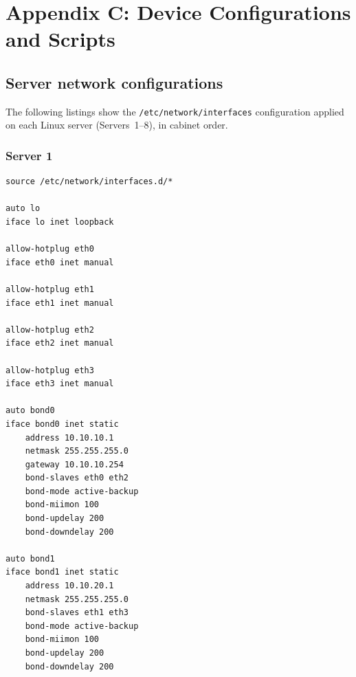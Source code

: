 \chapter{Appendix C: Device Configurations and Scripts}
\label{app:configs}

\section{Server network configurations}

The following listings show the \texttt{/etc/network/interfaces} configuration applied on each Linux server (Servers~1--8), in cabinet order.

\subsection{Server 1}
\begin{lstlisting}[caption={Server 1: network interfaces (Cabinet A).},basicstyle=\ttfamily\footnotesize,breaklines=true]
source /etc/network/interfaces.d/*

auto lo
iface lo inet loopback

allow-hotplug eth0
iface eth0 inet manual

allow-hotplug eth1
iface eth1 inet manual

allow-hotplug eth2
iface eth2 inet manual

allow-hotplug eth3
iface eth3 inet manual

auto bond0
iface bond0 inet static
    address 10.10.10.1
    netmask 255.255.255.0
    gateway 10.10.10.254
    bond-slaves eth0 eth2
    bond-mode active-backup
    bond-miimon 100
    bond-updelay 200
    bond-downdelay 200

auto bond1
iface bond1 inet static
    address 10.10.20.1
    netmask 255.255.255.0
    bond-slaves eth1 eth3
    bond-mode active-backup
    bond-miimon 100
    bond-updelay 200
    bond-downdelay 200
\end{lstlisting}

